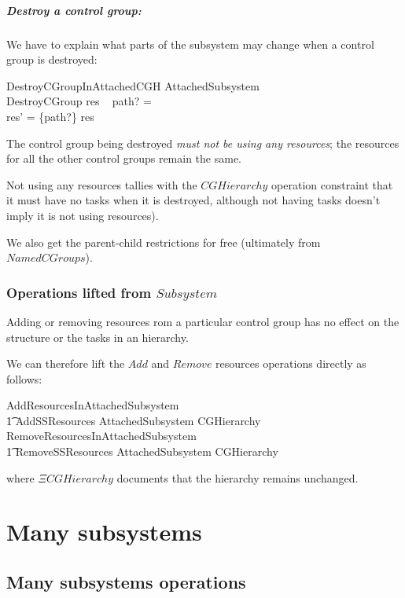 \documentclass[a4paper,twoside,12pt]{article}
\begin{document}
\subparagraph{Destroy a control group:}
We have to explain what parts of the subsystem may change when a control group is destroyed:

\begin{schema}{DestroyCGroupInAttachedCGH}
\Delta AttachedSubsystem \\
DestroyCGroup
\where
res ~ path? = \emptyset \\
res' = \{path?\} \ndres res 
\end{schema}
The control group being destroyed \emph{must not be using any resources};
the resources for all the other control groups remain 
the same. 

Not using any resources tallies with the $CGHierarchy$ operation constraint that it must have no tasks when it is
destroyed, although not having tasks doesn't imply it is not using resources).

We also get the parent-child restrictions for free (ultimately from $NamedCGroups$).

\subsubsection{Operations lifted from $Subsystem$}

Adding or removing resources rom a particular control group has no effect on the structure or the tasks
in an hierarchy.

We can therefore lift the $Add$ and $Remove$ resources operations directly as follows:

\begin{zed}
AddResourcesInAttachedSubsystem  \\
\t1 AddSSResources \land \Delta AttachedSubsystem \land \Xi CGHierarchy
\also
RemoveResourcesInAttachedSubsystem  \\
\t1 RemoveSSResources \land \Delta AttachedSubsystem \land \Xi CGHierarchy
\end{zed}
where $\Xi CGHierarchy$ documents that the hierarchy remains unchanged.

\section{Many subsystems}


\subsection{Many subsystems operations}
\end{document}
